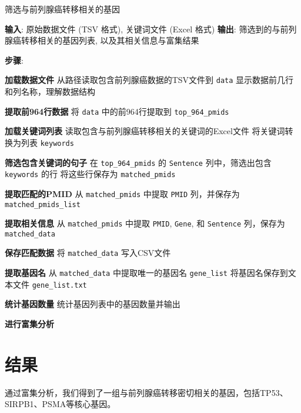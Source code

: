 \documentclass{article}
\begin{document}
\begin{algorithm}
\caption{筛选与前列腺癌转移相关的基因}
\begin{algorithmic}[1]
\State \textbf{输入}: 原始数据文件 (TSV 格式), 关键词文件 (Excel 格式)
\State \textbf{输出}: 筛选到的与前列腺癌转移相关的基因列表, 以及其相关信息与富集结果

\State \textbf{步骤}:

\State \textbf{  加载数据文件}
\State \quad 从路径读取包含前列腺癌数据的TSV文件到 \texttt{data}
\State \quad 显示数据前几行和列名称，理解数据结构

\State \textbf{  提取前964行数据}
\State \quad 将 \texttt{data} 中的前964行提取到 \texttt{top\_964\_pmids}

\State \textbf{  加载关键词列表}
\State \quad 读取包含与前列腺癌转移相关的关键词的Excel文件
\State \quad 将关键词转换为列表 \texttt{keywords}

\State \textbf{  筛选包含关键词的句子}
\State \quad 在 \texttt{top\_964\_pmids} 的 \texttt{Sentence} 列中，筛选出包含 \texttt{keywords} 的行
\State \quad 将这些行保存为 \texttt{matched\_pmids}

\State \textbf{  提取匹配的PMID}
\State \quad 从 \texttt{matched\_pmids} 中提取 \texttt{PMID} 列，并保存为 \texttt{matched\_pmids\_list}

\State \textbf{  提取相关信息}
\State \quad 从 \texttt{matched\_pmids} 中提取 \texttt{PMID}, \texttt{Gene}, 和 \texttt{Sentence} 列，保存为 \texttt{matched\_data}

\State \textbf{  保存匹配数据}
\State \quad 将 \texttt{matched\_data} 写入CSV文件

\State \textbf{  提取基因名}
\State \quad 从 \texttt{matched\_data} 中提取唯一的基因名 \texttt{gene\_list}
\State \quad 将基因名保存到文本文件 \texttt{gene\_list.txt}

\State \textbf{  统计基因数量}
\State \quad 统计基因列表中的基因数量并输出

\State \textbf{  进行富集分析}
\end{algorithmic}
\end{algorithm}

\section*{结果}
通过富集分析，我们得到了一组与前列腺癌转移密切相关的基因，包括TP53、SIRPB1、PSMA等核心基因。
\end{document}
